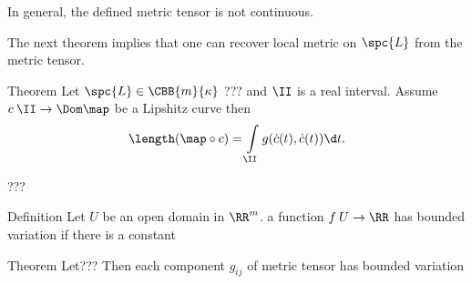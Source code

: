 {In general, the defined metric tensor is not continuous.

The next theorem implies that one can recover local metric on $\spc{L}$ from the metric tensor.

\begin{thm}{Theorem}
Let $\spc{L}\in\CBB{m}{\kappa}$ ???
and $\II$ is a real interval.
Assume $c\:\II\to\Dom\map$ be a Lipshitz curve then
$$\length(\map\circ c)=\int\limits_\II g(\dot c(t),\dot c(t))\d t.$$
\end{thm}

???
\qeds

\begin{thm}{Definition}
Let $U$ be an open domain in $\RR^m$.
a function $f\:U\to\RR$ has bounded variation if there is a constant 
\end{thm}


\begin{thm}{Theorem}
Let???
Then each component $g_{ij}$ of metric tensor has bounded variation
\end{thm}




































}
